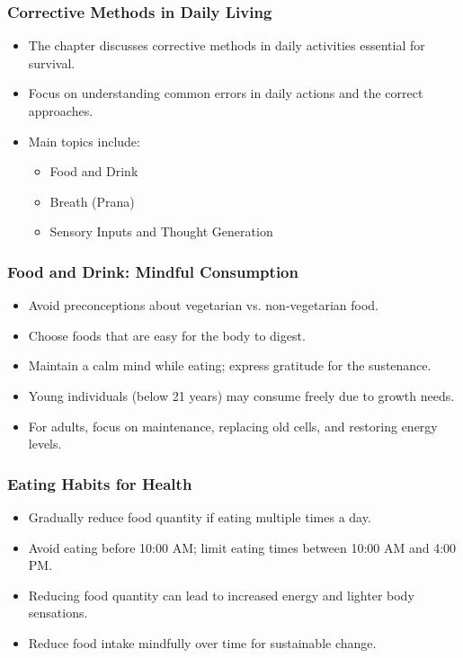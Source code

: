 \begin{frame}[fragile]\frametitle{Corrective Methods in Daily Living}
    \begin{itemize}
        \item The chapter discusses corrective methods in daily activities essential for survival.
        \item Focus on understanding common errors in daily actions and the correct approaches.
        \item Main topics include:
        \begin{itemize}
            \item Food and Drink
            \item Breath (Prana)
            \item Sensory Inputs and Thought Generation
        \end{itemize}
    \end{itemize}
\end{frame}

\begin{frame}[fragile]\frametitle{Food and Drink: Mindful Consumption}
    \begin{itemize}
        \item Avoid preconceptions about vegetarian vs. non-vegetarian food.
        \item Choose foods that are easy for the body to digest.
        \item Maintain a calm mind while eating; express gratitude for the sustenance.
        \item Young individuals (below 21 years) may consume freely due to growth needs.
        \item For adults, focus on maintenance, replacing old cells, and restoring energy levels.
    \end{itemize}
\end{frame}

\begin{frame}[fragile]\frametitle{Eating Habits for Health}
    \begin{itemize}
        \item Gradually reduce food quantity if eating multiple times a day.
        \item Avoid eating before 10:00 AM; limit eating times between 10:00 AM and 4:00 PM.
        \item Reducing food quantity can lead to increased energy and lighter body sensations.
        \item Reduce food intake mindfully over time for sustainable change.
    \end{itemize}
\end{frame}

